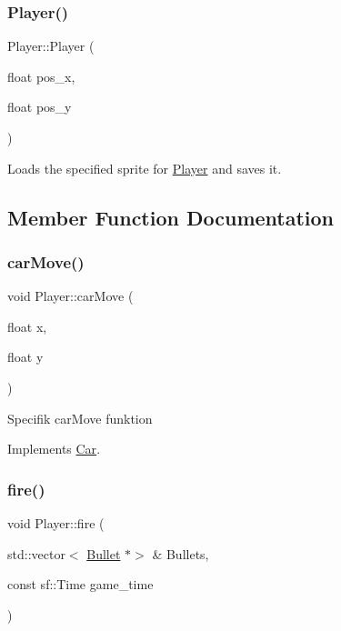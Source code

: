 \subsubsection{\texorpdfstring{Player()}{Player()}}
{\footnotesize\ttfamily Player\+::\+Player (\begin{DoxyParamCaption}\item[{float}]{pos\+\_\+x,  }\item[{float}]{pos\+\_\+y }\end{DoxyParamCaption})}

Loads the specified sprite for \hyperlink{classPlayer}{Player} and saves it. 

\subsection{Member Function Documentation}
\mbox{\label{classPlayer_a962661bbdff64b195582edbd0dcb3e1e}} 
\subsubsection{\texorpdfstring{car\+Move()}{carMove()}}
{\footnotesize\ttfamily void Player\+::car\+Move (\begin{DoxyParamCaption}\item[{float}]{x,  }\item[{float}]{y }\end{DoxyParamCaption})\hspace{0.3cm}{\ttfamily [virtual]}}

Specifik car\+Move funktion 

Implements \hyperlink{classCar_a9650df764ceee00f738b888a7a976996}{Car}.

\mbox{\label{classPlayer_a8dded6e745a81ad9f0be87b865856de7}} 
\subsubsection{\texorpdfstring{fire()}{fire()}}
{\footnotesize\ttfamily void Player\+::fire (\begin{DoxyParamCaption}\item[{std\+::vector$<$ \hyperlink{classBullet}{Bullet} $\ast$$>$ \&}]{Bullets,  }\item[{const sf\+::\+Time}]{game\+\_\+time }\end{DoxyParamCaption})}

